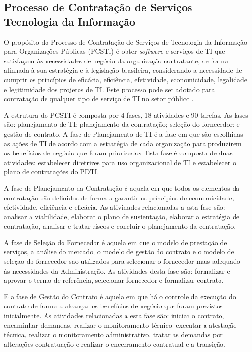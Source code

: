 \subsection[Processo de Contratação de Serviços Tecnologia da Informação]{Processo de Contratação de Serviços Tecnologia da Informação}

O propósito do Processo de Contratação de Serviços de Tecnologia da Informação para Organizações Públicas (PCSTI)  é obter \textit{software} e serviços de TI que satisfaçam às necessidades de negócio da organização contratante, de forma alinhada à sua estratégia e à legislação brasileira, considerando a necessidade de cumprir os princípios de eficácia, eficiência, efetividade, economicidade, legalidade e legitimidade dos projetos de TI. Este processo pode ser adotado para contratação de qualquer tipo de serviço de TI no setor público \cite{cruz2011}.

A estrutura do PCSTI é composta por 4 fases, 18 atividades e 90 tarefas. As fases são: planejamento de TI; planejamento da contratação; seleção do fornecedor; e gestão do contrato.  A fase de Planejamento de TI é a fase em que são escolhidas as ações de TI de acordo com a estratégia de cada organização para produzirem os benefícios de negócio que foram priorizados. Esta fase é composta de duas atividades: estabelecer diretrizes para uso organizacional de TI e estabelecer o plano de contratações do PDTI.

A fase de Planejamento da Contratação é aquela em que todos os elementos da contratação são definidos de forma a garantir os príncipios de economicidade, efetividade, eficiência e eficácia.  As atividades relacionadas a esta fase são: analisar a viabilidade, elaborar o plano de sustentação, elaborar a estratégia de contratação, analisar e tratar riscos e concluir o planejamento da contratação.

A fase de Seleção do Fornecedor é aquela em que o modelo de prestação de serviços, a análise do mercado, o modelo de gestão do contrato e o modelo de seleção do fornecedor são utilizados para selecionar o fornecedor mais adequado às necessidades da Administração. As atividades desta fase são: formalizar e aprovar o termo de referência, selecionar fornecedor e formalizar contrato.

E a fase de Gestão do Contrato é aquela em que há o controle da execução do contrato de forma a alcançar os benefícios de negócio que foram previstos inicialmente.  As atividades relacionadas a esta fase são: iniciar o contrato, encaminhar demandas, realizar o monitoramento técnico, executar a atestação técnica, realizar o monitoramento administrativo, tratar as demandas por alterações contratuação e realizar o encerramento contratual e a transição.



	